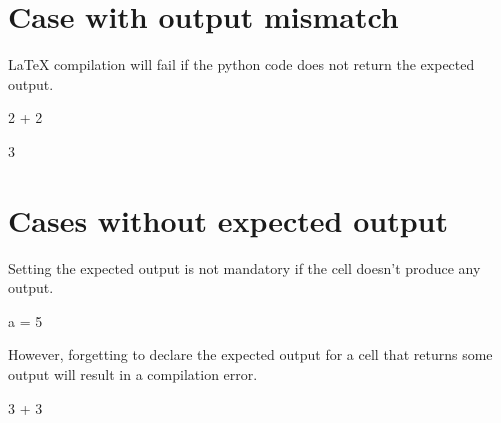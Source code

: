 \documentclass{book}
\begin{document}
\chapter{Case with output mismatch}

LaTeX compilation will fail if the python code does not return the expected output.

\begin{pycell}
2 + 2
\end{pycell}
\begin{pyexpectedoutput}
3
\end{pyexpectedoutput}

\chapter{Cases without expected output}

Setting the expected output is not mandatory if the cell doesn't produce any output.

\begin{pycell}
a = 5
\end{pycell}

However, forgetting to declare the expected output for a cell that returns some output will result in a compilation error.
\begin{pycell}
3 + 3
\end{pycell}

\ifPythonTeXLoaded
\else
\fi
\end{document}

